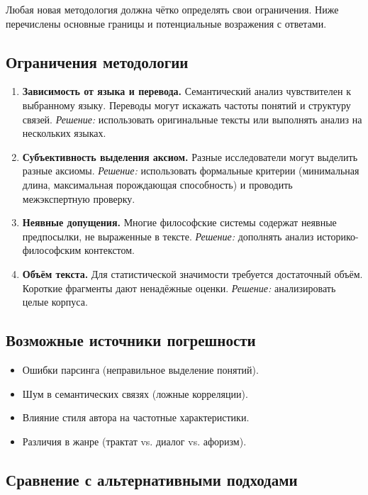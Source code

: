 \documentclass[12pt,a4paper]{article}
\begin{document}
	Любая новая методология должна чётко определять свои ограничения. Ниже перечислены основные границы и потенциальные возражения с ответами.
	
	\subsection{Ограничения методологии}
	
	\begin{enumerate}
		\item \textbf{Зависимость от языка и перевода.} Семантический анализ чувствителен к выбранному языку. Переводы могут искажать частоты понятий и структуру связей. \textit{Решение:} использовать оригинальные тексты или выполнять анализ на нескольких языках.
		\item \textbf{Субъективность выделения аксиом.} Разные исследователи могут выделить разные аксиомы. \textit{Решение:} использовать формальные критерии (минимальная длина, максимальная порождающая способность) и проводить межэкспертную проверку.
		\item \textbf{Неявные допущения.} Многие философские системы содержат неявные предпосылки, не выраженные в тексте. \textit{Решение:} дополнять анализ историко-философским контекстом.
		\item \textbf{Объём текста.} Для статистической значимости требуется достаточный объём. Короткие фрагменты дают ненадёжные оценки. \textit{Решение:} анализировать целые корпуса.
	\end{enumerate}
	
	\subsection{Возможные источники погрешности}
	
	\begin{itemize}
		\item Ошибки парсинга (неправильное выделение понятий).
		\item Шум в семантических связях (ложные корреляции).
		\item Влияние стиля автора на частотные характеристики.
		\item Различия в жанре (трактат vs. диалог vs. афоризм).
	\end{itemize}
	
	\subsection{Сравнение с альтернативными подходами}
	
\end{document}
